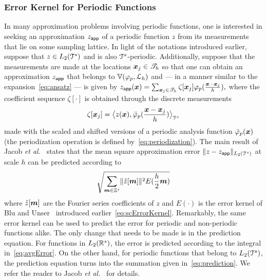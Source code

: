 \subsubsection{Error Kernel for Periodic Functions}
\label{sec:periodicErrorKernel}
In many approximation problems involving periodic functions, one is interested
in seeking an approximation $\appf{z}$ of a periodic function $z$ from its
measurements that lie on some sampling lattice. In light of the notations
introduced earlier, suppose that $z \in L_2(\cube^s)$ and is also
$\cube^s$-periodic. Additionally, suppose that the measurements are made at the
locations $\vect{x}_j \in \pointset{T}_h$ so that one can obtain an
approximation $\appf{z}$ that belongs to  $\aspace{\lattice{L}_h}{\varphi_p}$
and --- in a manner similar to the expansion~\eqref{eq:ansatz} --- is given by
$
  \appf{z}(\vect{x}) = \sum_{\vect{x}_j \in \pointset{T}_h}
  \zeta[\vect{x}_j] \varphi_p(\frac{\vect{x}-\vect{x}_j}{h}),
$
where the
coefficient sequence $\zeta[\cdot]$ is obtained through the discrete
measurements
\begin{equation}
  \zeta[\vect{x}_j] = \innerproduct{z(\vect{x})}{\analysis{\varphi}_p(\frac{\vect{x} - \vect{x}_j}{h})}
\label{eq:measurements}
\end{equation}
made with the scaled and shifted versions of a periodic analysis
function $\analysis{\varphi}_p(\vect{x})$ (the periodization operation
is defined by~\eqref{eq:periodization}). The main result of Jacob
\textit{et al.}~\cite{jacob02} states that the mean square
approximation error $\LLnorm{z - \appf{z}}$ at scale $h$ can
be predicted according to
\begin{equation}
  \sqrt{\sum_{\vect{m} \in \ints^s} \norm{\ft{z}[\vect{m}]}^2 E(\frac{h}{2}\vect{m})}
\label{eq:prediction}
\end{equation}
where $\ft{z}[\vect{m}]$ are the Fourier series coefficients of $z$
and $E(\cdot)$ is the error kernel of Blu and Unser~\cite{blu99}
introduced earlier~\eqref{eq:scErrorKernel}.  Remarkably, the same
error kernel can be used to predict the error for periodic and
non-periodic functions alike. The only change that needs to be made is
in the prediction equation. For functions in $L_2(\reel^s)$, the error
is predicted according to the integral in~\eqref{eq:avgError}. On the
other hand, for periodic functions that belong to $L_2(\cube^s)$, the
prediction equation turns into the summation given
in~\eqref{eq:prediction}. We refer the reader to Jacob \textit{et
  al.}~\cite{jacob02} for details.


